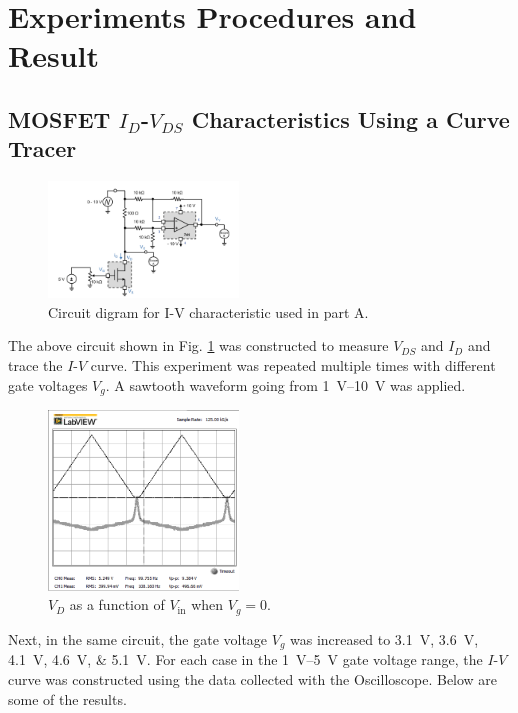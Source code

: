 \documentclass[journal]{IEEEtran}
\begin{document}
\section{Experiments Procedures and Result}
\subsection{MOSFET $I_{D}$-$V_{DS}$ Characteristics Using a Curve Tracer}
\begin{figure}[h]
  \centering
  \includegraphics[width=0.45\textwidth]{images/1.png}
  \caption{Circuit digram for I-V characteristic used in part A.}
  \label{fig-1}
\end{figure}
\par The above circuit shown in Fig. \ref{fig-1} was constructed to measure $V_{DS}$ and $I_{D}$
and trace the $I$-$V$ curve. This experiment was repeated multiple times with different
gate voltages $V_{g}$. A sawtooth waveform going from \SIrange{1}{10}{\volt} was applied.
\begin{figure}[h]
  \centering
  \includegraphics[width=0.45\textwidth]{images/1-2Vt.png}
  \caption{$V_{D}$ as a function of $V_{\text{in}}$ when $V_{g}=0$.}
  \label{fig-2}
\end{figure}
\par Next, in the same circuit, the gate voltage $V_{g}$ was increased to
\SIlist{3.1;3.6;4.1;4.6;5.1}{\volt}. For each case in the \SIrange{1}{5}{\volt}
gate voltage range, the $I$-$V$ curve was constructed using the data collected
with the Oscilloscope. Below are some of the results.
\end{document}
